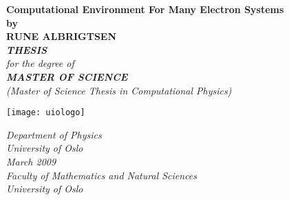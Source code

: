 \thispagestyle{empty}
\begin{center}        %
  \vspace{5mm}          %
  \LARGE
  \textbf{Computational Environment For Many Electron Systems} \\
  \Large
  \vspace{5mm}
  \textbf{by} \\
  \vspace{5mm}
  \large
  \textbf{RUNE ALBRIGTSEN} \\
  \vspace{20mm} 
  \Large
  {\bf{\textsl{THESIS}}} \\
  \textsl{for the degree of} \\
  \vspace{2mm}
  {\bf{\textsl{MASTER OF SCIENCE}}} \\
  \vspace{5mm}
  {\large \textsl {(Master of Science Thesis in Computational Physics)}}\\
  \vspace{10mm}
  \centerline{
\texttt{[image: uiologo]}}
  \vspace{5mm}
  \index{\footnote{}}%
  \textsl{Department of Physics} \\
  \textsl{University of Oslo} \\
  \vspace{10mm}
  \large
  \textsl{March 2009} \\
  \vspace{5mm}
  \normalsize
  \textsl{Faculty of Mathematics and Natural Sciences} \\
  \textsl{University of Oslo} \\
\end{center}
\thispagestyle{empty}
